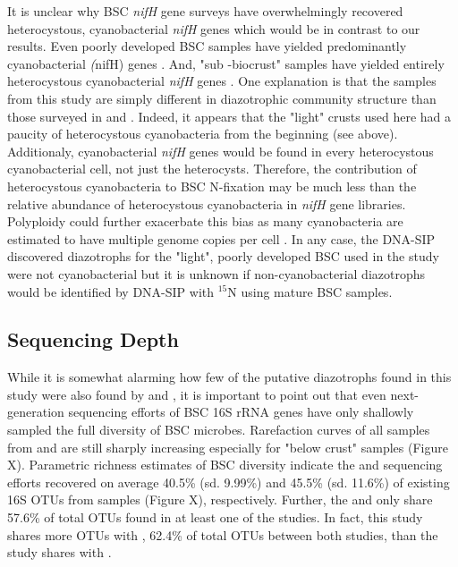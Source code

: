 It is unclear why BSC \textit{nifH} gene surveys have overwhelmingly recovered heterocystous, cyanobacterial \textit{nifH} genes which would be in contrast to our results. Even poorly developed BSC samples have yielded predominantly cyanobacterial \textit(nifH) genes \cite{14766579}. And, "sub -biocrust" samples have yielded entirely heterocystous cyanobacterial \textit{nifH} genes \cite{Yeager_2012}. One explanation is that the samples from this study are simply different in diazotrophic community structure than those surveyed in \citet{Yeager} \citet{14766579} and \citet{Yeager_2012}. Indeed, it appears that the "light" crusts used here had a paucity of heterocystous cyanobacteria from the beginning (see above). Additionaly, cyanobacterial \textit{nifH} genes would be found in every heterocystous cyanobacterial cell, not just the heterocysts. Therefore, the contribution of heterocystous cyanobacteria to BSC N-fixation may be much less than the relative abundance of heterocystous cyanobacteria in \textit{nifH} gene libraries. Polyploidy could further exacerbate this bias as many cyanobacteria are estimated to have multiple genome copies per cell \cite{Griese_2011}. In any case, the DNA-SIP discovered diazotrophs for the "light", poorly developed BSC used in the study were not cyanobacterial but it is unknown if non-cyanobacterial diazotrophs would be identified by DNA-SIP with $^{15}$N using mature BSC samples. 

\subsection{Sequencing Depth}
While it is somewhat alarming how few of the putative diazotrophs found in this study were also found by \citet{Garcia_Pichel_2013} and \citet{Steven_2013}, it is important to point out that even next-generation sequencing efforts of BSC 16S rRNA genes have only shallowly sampled the full diversity of BSC microbes. Rarefaction curves of all samples from \citet{Steven_2013} and \citet{Garcia_Pichel_2013} are still sharply increasing especially for "below crust" samples (Figure X). Parametric richness estimates of BSC diversity indicate the \citet{Steven_2013} and \citet{Garcia_Pichel_2013} sequencing efforts recovered on average 40.5\% (sd. 9.99\%) and 45.5\% (sd. 11.6\%) of existing 16S OTUs from samples (Figure X), respectively. Further, the \citet{Steven_2013} and \citet{Garcia_Pichel_2013} only share 57.6\% of total OTUs found in at least one of the studies. In fact, this study shares more OTUs with \citet{Steven_2013}, 62.4\% of total OTUs between both studies, than the \citet{Steven_2013} study shares with \citet{Garcia_Pichel_2013}. 

